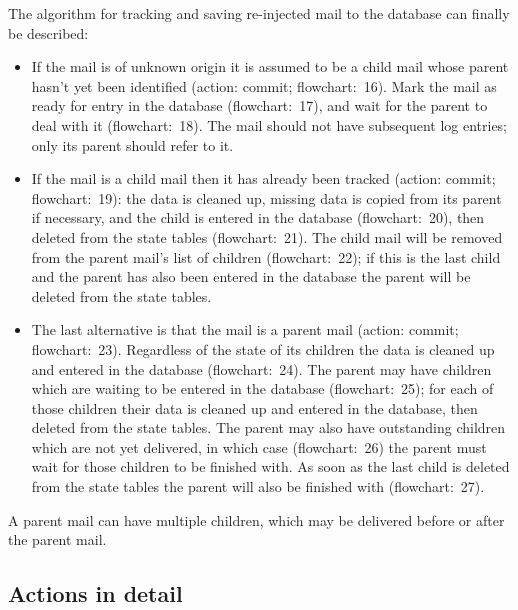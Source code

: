 \documentclass[a4paper,12pt,draft]{article}
\begin{document}
The algorithm for tracking and saving re-injected mail to the database can
finally be described:

\begin{itemize}

    \item If the mail is of unknown origin it is assumed to be a child mail
        whose parent hasn't yet been identified (action: commit;
        flowchart:~16).  Mark the mail as ready for entry in the database
        (flowchart:~17), and wait for the parent to deal with it
        (flowchart:~18).  The mail should not have subsequent log entries;
        only its parent should refer to it.

    \item If the mail is a child mail then it has already been tracked
        (action: commit; flowchart:~19): the data is cleaned up, missing
        data is copied from its parent if necessary, and the child is
        entered in the database (flowchart:~20), then deleted from the
        state tables (flowchart:~21).  The child mail will be removed from
        the parent mail's list of children (flowchart:~22); if this is the
        last child and the parent has also been entered in the database the
        parent will be deleted from the state tables.

    \item The last alternative is that the mail is a parent mail (action:
        commit; flowchart:~23).  Regardless of the state of its children
        the data is cleaned up and entered in the database (flowchart:~24).
        The parent may have children which are waiting to be entered in the
        database (flowchart:~25); for each of those children their data is
        cleaned up and entered in the database, then deleted from the state
        tables.  The parent may also have outstanding children which are
        not yet delivered, in which case (flowchart:~26) the parent must
        wait for those children to be finished with.  As soon as the last
        child is deleted from the state tables the parent will also be
        finished with (flowchart:~27).

\end{itemize}

A parent mail can have multiple children, which may be delivered before or
after the parent mail.  

\subsection{Actions in detail}
\end{document}
